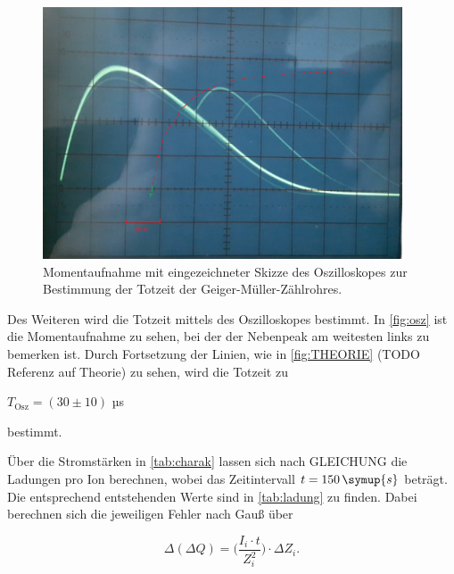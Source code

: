 \begin{figure}
  \centering
  \includegraphics[width=0.95\textwidth]{content/osz_m_skizze.png}
  \caption{Momentaufnahme mit eingezeichneter Skizze des Oszilloskopes zur Bestimmung der Totzeit der Geiger-Müller-Zählrohres.}
  \label{fig:osz-m-skizze}
\end{figure}

Des Weiteren wird die Totzeit mittels des Oszilloskopes bestimmt. In \autoref{fig:osz} ist die Momentaufnahme zu sehen, bei der der Nebenpeak am weitesten links zu bemerken ist.
Durch Fortsetzung der Linien, wie in \autoref{fig:THEORIE} (TODO Referenz auf Theorie) zu sehen, wird die Totzeit zu

\begin{center}
    $T_\text{Osz} = (30 \pm 10)$ µs
\end{center}

bestimmt.

Über die Stromstärken in \autoref{tab:charak} lassen sich nach GLEICHUNG die Ladungen pro Ion berechnen, 
wobei das Zeitintervall $t = 150 \, \symup{s}$ beträgt.
Die entsprechend entstehenden Werte sind in \autoref{tab:ladung} zu finden.
Dabei berechnen sich die jeweiligen Fehler nach Gauß über

\begin{equation}
    \Delta (\Delta Q) = \bigg( \frac{I_i \cdot t}{Z_i^2} \bigg) \cdot \Delta Z_i.
\end{equation}

